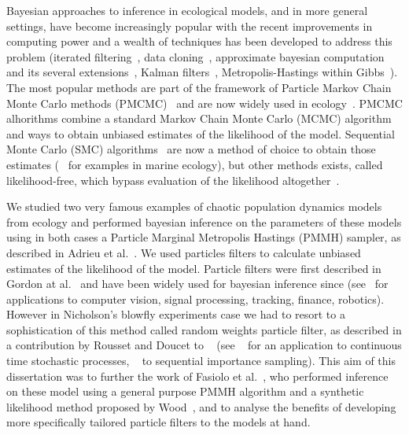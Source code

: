 \documentclass[12pt]{article}
\begin{document}
	Bayesian approaches to inference in ecological models, and in more general settings, have become increasingly popular with the recent improvements in computing power and a wealth of techniques has been developed to address this problem (iterated filtering~\cite{ionides2006inference}, data cloning~\cite{lele2007data}, approximate bayesian computation and its several extensions~\cite{marin2012approximate}, Kalman filters~\cite{sorenson1960kalman}, Metropolis-Hastings within Gibbs~\cite{geweke2001bayesian}). \\
	The most popular methods are part of the framework of Particle Markov Chain Monte Carlo methods (PMCMC)~\cite{andrieu2010particle} and are now widely used in ecology~\cite{peters2010ecological, gao2012bayesian, fasiolo2014statistical}. PMCMC alhorithms combine a standard Markov Chain Monte Carlo (MCMC) algorithm and ways to obtain unbiased estimates of the likelihood of the model. Sequential Monte Carlo (SMC) algorithms~\cite{del2004feynman} are now a method of choice to obtain those estimates (~\cite{losa2003sequential, dowd2006sequential, jones2010bayesian} for examples in marine ecology), but other methods exists, called likelihood-free, which bypass evaluation of the likelihood altogether~\cite{marjoram2003markov}.
	
	We studied two very famous examples of chaotic population dynamics models from ecology and performed bayesian inference on the parameters of these models using in both cases a Particle Marginal Metropolis Hastings (PMMH) sampler, as described in Adrieu et al.~\cite{andrieu2010particle}. We used particles filters to calculate unbiased estimates of the likelihood of the model. Particle filters were first described in Gordon at al.~\cite{gordon1993novel} and have been widely used for bayesian inference since (see~\cite{ristic2004beyond, cappe2006inference, smith2013sequential, liu2008monte} for applications to computer vision, signal processing, tracking, finance, robotics). However in Nicholson's blowfly experiments case we had to resort to a sophistication of this method called random weights particle filter, as described in a contribution by Rousset and Doucet to ~\cite{beskos2006exact} (see ~\cite{fearnhead2010random} for an application to continuous time stochastic processes, ~\cite{fearnhead2008particle} to sequential importance sampling). This aim of this dissertation was to further the work of Fasiolo et al.~\cite{fasiolo2014statistical}, who performed inference on these model using a general purpose PMMH algorithm and a synthetic likelihood method proposed by Wood~\cite{wood2010statistical}, and to analyse the benefits of developing more specifically tailored particle filters to the models at hand.
	
\end{document}
